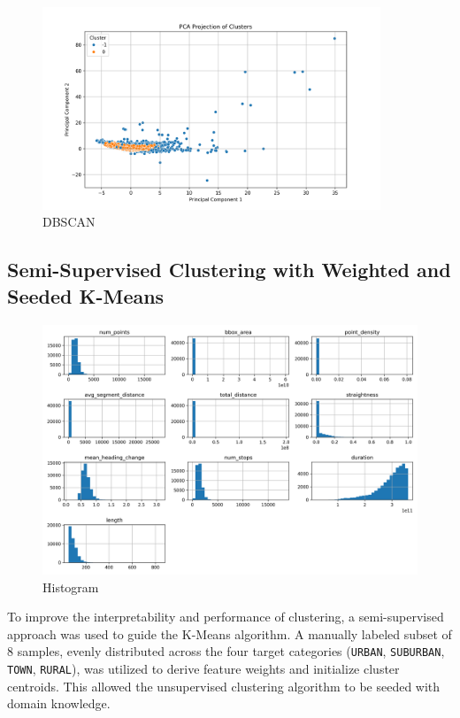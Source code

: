 \documentclass[a4paper,12pt,twoside]{scrreprt}
\begin{document}
\begin{figure}[htbp]
  \centering

  \includegraphics[width=0.9\textwidth]{Figures/dbscan_diagram_feature_data.png}
  \caption{DBSCAN}
  \label{fig:dbscan-clustering-outlier-removal}
\end{figure}
\FloatBarrier

\subsection{Semi-Supervised Clustering with Weighted and Seeded K-Means}
\begin{figure}[htbp]
  \centering

  \includegraphics[width=1\textwidth]{Figures/histogram_feature_data_pre_clustering.png}
  \caption{Histogram}
  \label{fig:histogram-feature-engineered-data}
\end{figure}
\FloatBarrier


To improve the interpretability and performance of clustering, a
semi-supervised approach was used to guide the K-Means algorithm. A manually
labeled subset of 8 samples, evenly distributed across the four target
categories (\texttt{URBAN}, \texttt{SUBURBAN}, \texttt{TOWN}, \texttt{RURAL}),
was utilized to derive feature weights and initialize cluster centroids. This
allowed the unsupervised clustering algorithm to be seeded with domain
knowledge.
\end{document}
